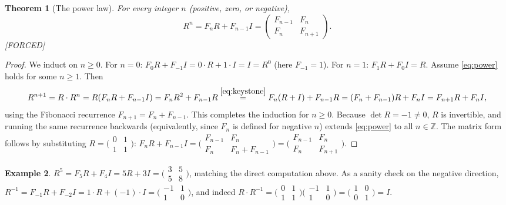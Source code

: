 \documentclass[11pt]{article}
\theoremstyle{plain}
\newtheorem{theorem}{Theorem}[section]
\theoremstyle{definition}
\newtheorem{example}[theorem]{Example}
\theoremstyle{remark}
\newcommand{\Forced}{\textcolor{forcedc}{[FORCED]}}
\begin{document}
\begin{theorem}[The power law]\label{thm:power}
For every integer $n$ (positive, zero, or negative),
\begin{equation}\label{eq:power}
R^{n}=F_nR+F_{n-1}I=\begin{pmatrix}F_{n-1}&F_n\\ F_n&F_{n+1}\end{pmatrix}.
\end{equation}
\Forced
\end{theorem}
\begin{proof}
We induct on $n\ge 0$. For $n=0$: $F_0R+F_{-1}I=0\cdot R+1\cdot I=I=R^{0}$ (here $F_{-1}=1$). For $n=1$: $F_1R+F_0I=R$. Assume \eqref{eq:power} holds for some $n\ge 1$. Then
\[
R^{n+1}=R\cdot R^{n}=R(F_nR+F_{n-1}I)=F_nR^{2}+F_{n-1}R\overset{\eqref{eq:keystone}}{=}F_n(R+I)+F_{n-1}R=(F_n+F_{n-1})R+F_nI=F_{n+1}R+F_nI,
\]
using the Fibonacci recurrence $F_{n+1}=F_n+F_{n-1}$. This completes the induction for $n\ge0$. Because $\det R=-1\ne0$, $R$ is invertible, and running the same recurrence backwards (equivalently, since $F_n$ is defined for negative $n$) extends \eqref{eq:power} to all $n∈ℤ$. The matrix form follows by substituting $R=\bigl(\begin{smallmatrix}0&1\\1&1\end{smallmatrix}\bigr)$: $F_nR+F_{n-1}I=\bigl(\begin{smallmatrix}F_{n-1}&F_n\\ F_n&F_n+F_{n-1}\end{smallmatrix}\bigr)=\bigl(\begin{smallmatrix}F_{n-1}&F_n\\ F_n&F_{n+1}\end{smallmatrix}\bigr)$.
\end{proof}

\begin{example}\label{ex:power}
$R^{5}=F_5R+F_4I=5R+3I=\bigl(\begin{smallmatrix}3&5\\5&8\end{smallmatrix}\bigr)$, matching the direct computation above. As a sanity check on the negative direction, $R^{-1}=F_{-1}R+F_{-2}I=1\cdot R+(-1)\cdot I=\bigl(\begin{smallmatrix}-1&1\\1&0\end{smallmatrix}\bigr)$, and indeed $R\cdot R^{-1}=\bigl(\begin{smallmatrix}0&1\\1&1\end{smallmatrix}\bigr)\bigl(\begin{smallmatrix}-1&1\\1&0\end{smallmatrix}\bigr)=\bigl(\begin{smallmatrix}1&0\\0&1\end{smallmatrix}\bigr)=I$.
\end{example}
\end{document}

